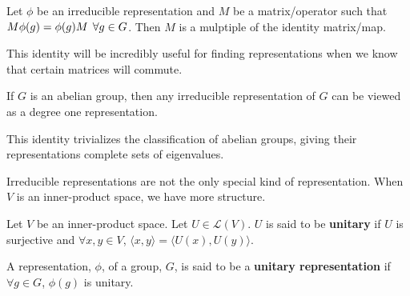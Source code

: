 \documentclass[compress,aspectratio=169,10pt,usenames,dvipsnames]{beamer}
\begin{document}
\begin{frame}
\vfill
\begin{theorem}
	Let $\phi$ be an irreducible representation and $M$ be a matrix/operator such that $M\phi(g)=\phi(g)M \hspace{1.5mm}\forall g \in G$. Then $M$ is a mulptiple of the identity matrix/map.
\end{theorem}
\vfill
This identity will be incredibly useful for finding representations when we know that certain matrices will commute.
\vfill
\end{frame}

\begin{frame}
\vfill
\begin{theorem}
If $G$ is an abelian group, then any irreducible representation of $G$ can be viewed as a degree one representation.
\end{theorem}
\vfill
This identity trivializes the classification of abelian groups, giving their representations complete sets of eigenvalues.
\end{frame}
%
%
\begin{frame}
\vfill
Irreducible representations are not the only special kind of representation. When $V$ is an inner-product space, we have more structure.
\vfill
\begin{definition}
	Let $V$ be an inner-product space. Let $U \in \mathcal{L}(V)$. $U$ is said to be \textbf{unitary} if $U$ is surjective and $\forall x,y \in V$, $\langle x , y \rangle = \langle U(x) , U(y) \rangle$.
\end{definition}
\vfill
\begin{definition}
	A representation, $\phi$, of a group, $G$, is said to be a \textbf{unitary representation} if $\forall g\in G$, $\phi(g)$ is unitary.
\end{definition}
\vfill
\end{frame}
\end{document}
